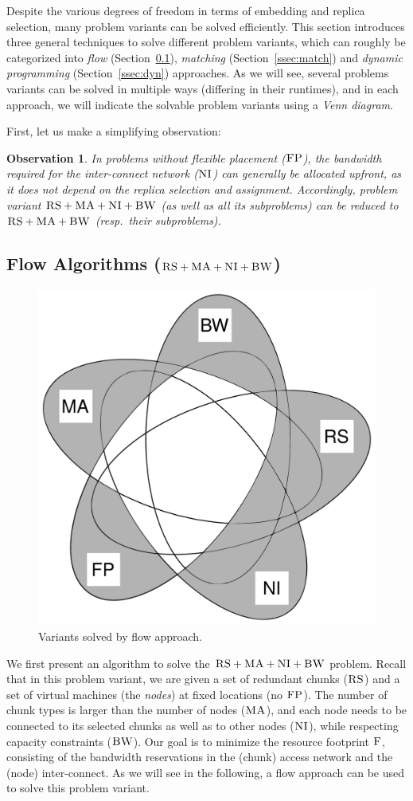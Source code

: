 \documentclass[9pt]{sigcomm-alternate}
\newcommand{\CC}{\textsc{NI}}
\newcommand{\FP}{\textsc{FP}}
\newcommand{\RS}{\textsc{RS}}
\newcommand{\BW}{\textsc{BW}}
\newcommand{\MA}{\textsc{MA}}
\newcommand{\Cost}{\textsc{F}}
\newtheorem{obs}{Observation}
\begin{document}
Despite the various degrees of freedom in terms of embedding and replica selection,
 many problem variants can be solved efficiently.
 This section introduces three general techniques to solve different problem variants,
 which can roughly be categorized into
 \emph{flow} (Section~\ref{ssec:flow}), \emph{matching} (Section~\ref{ssec:match}) and \emph{dynamic programming}
 (Section~\ref{ssec:dyn}) approaches.
 As we will see, several problems variants can be solved in multiple ways (differing in their runtimes),
 and in each approach, we will indicate the solvable problem variants using a \emph{Venn diagram}.

First, let us make a simplifying observation:
\begin{obs}\label{obs:nofp}
In problems without flexible placement ($\FP$),
the bandwidth required
for the inter-connect network ($\CC$) can generally be allocated \emph{upfront}, as it
does not depend on the replica
selection and assignment.
Accordingly, problem variant $\RS+\MA+\CC +\BW$ (as well as all its subproblems)
can be reduced to $\RS+\MA+\BW$ (resp.~their subproblems).
\end{obs}

\subsection{Flow Algorithms ($\RS+\MA+\CC+\BW$)}\label{ssec:flow}

\begin{figure}
\includegraphics[width=0.48\columnwidth]{figs/venn_flow.pdf}
\caption{Variants solved by flow approach.}
\label{fig:venn_flow}
\end{figure}

We first present an algorithm to solve the $\RS+\MA+\CC+\BW$ problem.
Recall that in this problem variant,
we are given a set of redundant chunks ($\RS$) and a set of virtual machines
(the \emph{nodes})
at fixed locations (no $\FP$). The number of chunk types is larger than the number
of nodes ($\MA$), and each node needs to be connected
to its selected chunks as well as to other nodes ($\CC$), while respecting
capacity constraints ($\BW$).
Our goal is to minimize the resource footprint $\Cost$, consisting
of the bandwidth reservations in the (chunk) access network and the (node)
inter-connect.
As we will see in the following, a flow approach can be used to solve this
problem variant.
\end{document}
